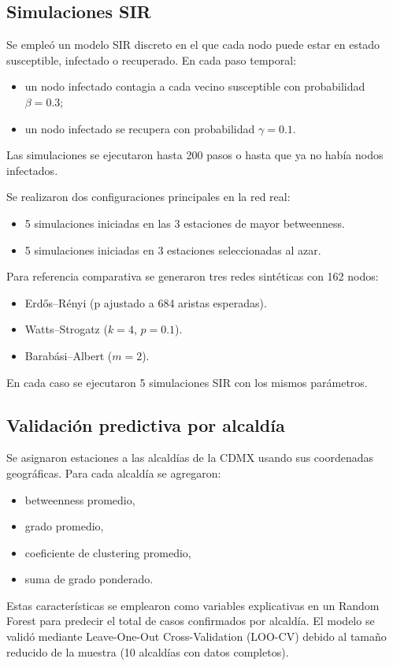 \documentclass[10pt,twocolumn]{article}
\begin{document}
\subsection{Simulaciones SIR}
Se empleó un modelo SIR discreto en el que cada nodo puede estar en estado susceptible, infectado o recuperado. En cada paso temporal:
\begin{itemize}[nosep,leftmargin=*]
    \item un nodo infectado contagia a cada vecino susceptible con probabilidad $\beta = 0.3$;
    \item un nodo infectado se recupera con probabilidad $\gamma = 0.1$.
\end{itemize}
Las simulaciones se ejecutaron hasta 200 pasos o hasta que ya no había nodos infectados.

Se realizaron dos configuraciones principales en la red real:
\begin{itemize}[nosep,leftmargin=*]
    \item 5 simulaciones iniciadas en las 3 estaciones de mayor betweenness.
    \item 5 simulaciones iniciadas en 3 estaciones seleccionadas al azar.
\end{itemize}

Para referencia comparativa se generaron tres redes sintéticas con 162 nodos:
\begin{itemize}[nosep,leftmargin=*]
    \item Erdős--Rényi (p ajustado a 684 aristas esperadas).
    \item Watts--Strogatz ($k=4$, $p=0.1$).
    \item Barabási--Albert ($m=2$).
\end{itemize}
En cada caso se ejecutaron 5 simulaciones SIR con los mismos parámetros.

\subsection{Validación predictiva por alcaldía}
Se asignaron estaciones a las alcaldías de la CDMX usando sus coordenadas geográficas. Para cada alcaldía se agregaron:
\begin{itemize}[nosep,leftmargin=*]
    \item betweenness promedio,
    \item grado promedio,
    \item coeficiente de clustering promedio,
    \item suma de grado ponderado.
\end{itemize}
Estas características se emplearon como variables explicativas en un Random Forest para predecir el total de casos confirmados por alcaldía. El modelo se validó mediante Leave-One-Out Cross-Validation (LOO-CV) debido al tamaño reducido de la muestra (10 alcaldías con datos completos).
\end{document}
